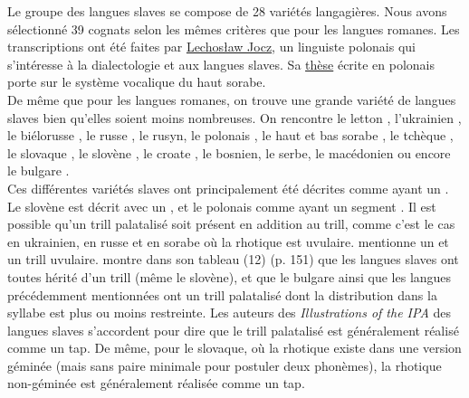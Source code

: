 Le groupe des langues slaves se compose de 28 variétés langagières. Nous avons sélectionné 39 cognats selon les mêmes critères que pour les langues romanes. Les transcriptions ont été faites par \href{https://orcid.org/0000-0002-4714-8462}{Lechosław Jocz}, un linguiste polonais qui s'intéresse à la dialectologie et aux langues slaves. Sa \href{https://www.academia.edu/7302143/Jocz_Wokalowy_system_hornjoserbskeje_r\%C4\%9B\%C4\%8De_p\%C5\%99itomnos\%C4\%87e}{thèse} \parencite{joczWokalowySystemHornjoserbskeje2011} écrite en polonais porte sur le système vocalique du haut sorabe.\\

De même que pour les langues romanes, on trouve une grande variété de langues slaves bien qu'elles soient moins nombreuses. On rencontre le letton \parencite{brenzingerNotesPhoneticsLatvian1973}, l'ukrainien \parencite{pompino-marschallUkrainian2017}, le biélorusse \parencite{birdBelarusian2020}, le russe \parencite{yanushevskayaRussian2015}, le rusyn, le polonais \parencite{jassemPolish2003}, le haut et bas sorabe \parencite{howsonUpperSorbian2017}, le tchèque \parencite{dankovicovaCzech1997,simackovaCzechSpokenBohemia2012}, le slovaque \parencite{hanulikovaSlovak2010}, le slovène \parencite{sustarsicSlovene1995}, le croate \parencite{landauCroatian1995}, le bosnien, le serbe, le macédonien ou encore le bulgare \parencite{ternesBulgarian1990}.\\

Ces différentes variétés slaves ont principalement été décrites comme ayant un .
Le slovène est décrit avec un , et le polonais comme ayant un segment .
Il est possible qu'un trill palatalisé soit présent en addition au trill, comme c'est le cas en ukrainien, en russe et en sorabe où la rhotique est uvulaire. \textcite{howsonUpperSorbian2017} mentionne un  et un  trill uvulaire. \textcite{zygisMarkednessTrillsCase2004} montre dans son tableau (12) (p. 151) que les langues slaves ont toutes hérité d'un trill (même le slovène), et que le bulgare ainsi que les langues précédemment mentionnées ont un trill palatalisé dont la distribution dans la syllabe est plus ou moins restreinte.
Les auteurs des \textit{Illustrations of the IPA} des langues slaves s'accordent pour dire que le trill palatalisé est généralement réalisé comme un tap. De même, pour le slovaque, où la rhotique existe dans une version géminée (mais sans paire minimale pour postuler deux phonèmes), la rhotique non-géminée est généralement réalisée comme un tap.

